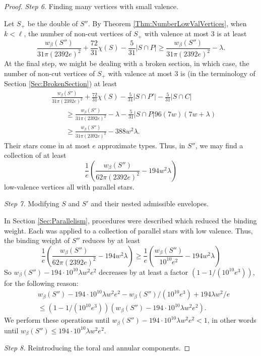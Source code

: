 \documentclass[oneside]{amsart}
\numberwithin{equation}{section}
\theoremstyle{plain}
\theoremstyle{definition}
\begin{document}
\begin{proof}
\medskip 
\emph{Step 6.} Finding many vertices with small valence.


Let $S_+$ be the double of $S''$.  By Theorem \ref{Thm:NumberLowValVertices}, when $k < \ell$,
the number of non-cut vertices of $S_+$ with valence at most $3$ is 
at least
$$\frac{w_\beta(S'')}{31\pi (2392e)^2} + \frac{72}{31} \chi(S) - \frac{5}{31}|S \cap P| \geq \frac{w_\beta(S'')}{31\pi (2392e)^2} - \lambda .$$
At the final step, we might be dealing with a broken section, in which case,
the number of non-cut vertices of $S_+$ with valence at most $3$ is (in the terminology of Section \ref{Sec:BrokenSection}) at least
\begin{align*}
& \frac{w_\beta(S'')}{31\pi (2392e)^2} + \frac{72}{31} \chi(S) - \frac{5}{31}|S \cap P'| - \frac{5}{31}|S \cap C| \\
&\qquad \geq \frac{w_\beta(S'')}{31\pi (2392e)^2} - \lambda - \frac{5}{31}|S \cap P| 96(7w)(7w+\lambda) \\
&\qquad \geq \frac{w_\beta(S'')}{31\pi (2392e)^2} - 388w^2 \lambda.
\end{align*}
Their stars come in at most $e$ approximate types. Thus, in $S''$, we may find a collection of at least 
$$\frac{1}{e}
\left(\frac{w_\beta(S'')}{62\pi (2392e)^2} - 194w^2\lambda  \right)$$
low-valence vertices all with parallel stars.

\medskip
\emph{Step 7.} Modifying $S$ and $S'$ and their nested admissible envelopes.

In Section \ref{Sec:Parallelism}, procedures were described which reduced the binding weight.
Each was applied to a collection of parallel stars with low valence.
Thus, the binding weight of $S''$ reduces by at least 
$$\frac{1}{e}
\left(\frac{w_\beta(S'')}{62\pi (2392e)^2} - 194 w^2 \lambda\right) \geq
\frac{1}{e}
\left(\frac{w_\beta(S'')}{10^{10} e^2} - 194 w^2 \lambda \right)
$$
So $w_\beta(S'') - 194 \cdot 10^{10} \lambda w^2 e^2$ decreases by at least a factor $(1 - 1/(10^{10} e^3))$, for the following reason:
\begin{align*}
& w_\beta(S'') - 194 \cdot 10^{10} \lambda w^2e^2 - w_\beta(S'')/(10^{10} e^3) + 194\lambda w^2/e \\
& \leq
(1 - 1/(10^{10} e^3)) (w_\beta(S'') - 194 \cdot 10^{10} \lambda w^2 e^2).
\end{align*}
We perform these operations until $w_\beta(S'') - 194\cdot 10^{10} \lambda w^2 e^2 < 1$, in other words until
$w_\beta(S'') \leq 194 \cdot 10^{10} \lambda w^2 e^2$.

\medskip 
\emph{Step 8.} Reintroducing the toral and annular components.


\end{proof}
\end{document}
